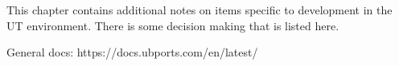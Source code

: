 \label{ch:UT_notes}

This chapter contains additional notes on items specific to development in the UT environment. There is some decision making that is listed here.


General docs:
https://docs.ubports.com/en/latest/






